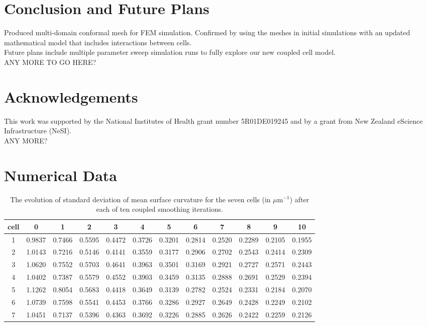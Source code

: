 \documentclass[a4paper,10pt]{article}
\begin{document}
\section{Conclusion and Future Plans}

Produced multi-domain conformal mesh for FEM simulation.
Confirmed by using the meshes in initial simulations with an updated mathematical model that includes interactions between cells.\\

Future plans include multiple parameter sweep simulation runs to fully explore our new coupled cell model.\\
ANY MORE TO GO HERE?\\

\section{Acknowledgements}
This work was supported by the National Institutes of Health grant number 5R01DE019245 and by a grant from New Zealand eScience Infrastructure (NeSI).\\
ANY MORE?\\




\pagebreak
\appendix

\section{Numerical Data}

\begin{table}[H]
\begin{center}
\footnotesize
\begin{tabular}{|c|ccccccccccc|}
\hline
cell & 0 &1 &2 &3 &4 &5 &6 &7 &8 &9 &10\\
\hline

1 &0.9837 &0.7466 &0.5595 &0.4472 &0.3726 &0.3201 &0.2814 &0.2520 &0.2289 &0.2105 &0.1955\\
2 &1.0143 &0.7216 &0.5146 &0.4141 &0.3559 &0.3177 &0.2906 &0.2702 &0.2543 &0.2414 &0.2309\\
3 &1.0620 &0.7552 &0.5703 &0.4641 &0.3963 &0.3501 &0.3169 &0.2921 &0.2727 &0.2571 &0.2443\\
4 &1.0402 &0.7387 &0.5579 &0.4552 &0.3903 &0.3459 &0.3135 &0.2888 &0.2691 &0.2529 &0.2394\\
5 &1.1262 &0.8054 &0.5683 &0.4418 &0.3649 &0.3139 &0.2782 &0.2524 &0.2331 &0.2184 &0.2070\\
6 &1.0739 &0.7598 &0.5541 &0.4453 &0.3766 &0.3286 &0.2927 &0.2649 &0.2428 &0.2249 &0.2102\\
7 &1.0451 &0.7137 &0.5396 &0.4363 &0.3692 &0.3226 &0.2885 &0.2626 &0.2422 &0.2259 &0.2126\\
\hline
\end{tabular}
\end{center}
\caption{The evolution of standard deviation of mean surface curvature for the seven cells (in $\mu \text{m}^{-1}$)  after each of ten coupled smoothing iterations.}
\label{tab:curv}
\end{table}
\end{document}

